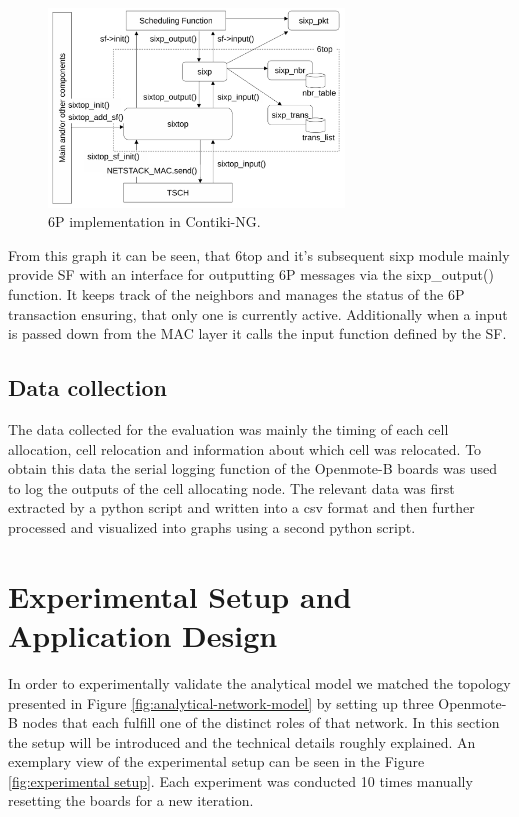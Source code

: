 \documentclass{comnets-thesis}
\begin{document}
\begin{figure}[H]
    \centering
    \includegraphics[width=0.7\textwidth]{./images/sixp in contiki.png}
    \caption{\ac{6P} implementation in Contiki-NG. \cite{sixpImplementationContiki}}
    \label{fig:sixp-implementation}
\end{figure}

From this graph it can be seen, that \ac{6top} and it's subsequent sixp module mainly provide \ac{SF} with an interface for outputting \ac{6P} messages via the sixp\_output() function. It keeps track of the neighbors and manages the status of the \ac{6P} transaction ensuring, that only one is currently active.
Additionally when a input is passed down from the \ac{MAC} layer it calls the input function defined by the \ac{SF}.


\subsection{ Data collection }
The data collected for the evaluation was mainly the timing of each cell allocation, cell relocation and information about which cell was relocated. To obtain this data the serial logging function of the Openmote-B boards was used to log the outputs of the cell allocating node. The relevant data was first extracted by a python script and written into a csv format and then further processed and visualized into graphs using a second python script.


\section{Experimental Setup and Application Design}
In order to experimentally validate the analytical model we matched the topology presented in Figure \ref{fig:analytical-network-model} by setting up three Openmote-B nodes that each fulfill one of the distinct roles of that network. In this section the setup will be introduced and the technical details roughly explained. An exemplary view of the experimental setup can be seen in the Figure \ref{fig:experimental setup}. Each experiment was conducted 10 times manually resetting the boards for a new iteration.
\end{document}
